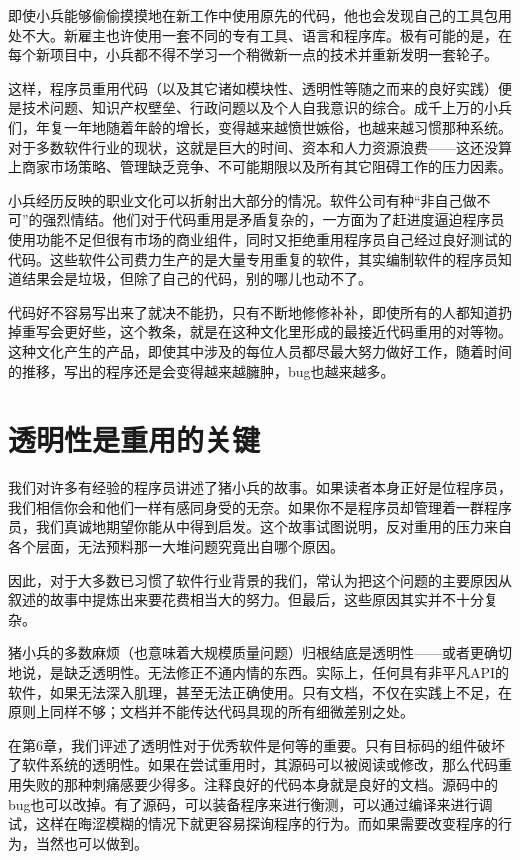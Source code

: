 \documentclass[12pt,oneside]{book}
\begin{document}
即使小兵能够偷偷摸摸地在新工作中使用原先的代码，他也会发现自己的工具包用处不大。新雇主也许使用一套不同的专有工具、语言和程序库。极有可能的是，在每个新项目中，小兵都不得不学习一个稍微新一点的技术并重新发明一套轮子。

这样，程序员重用代码（以及其它诸如模块性、透明性等随之而来的良好实践）便是技术问题、知识产权壁垒、行政问题以及个人自我意识的综合。成千上万的小兵们，年复一年地随着年龄的增长，变得越来越愤世嫉俗，也越来越习惯那种系统。对于多数软件行业的现状，这就是巨大的时间、资本和人力资源浪费——这还没算上商家市场策略、管理缺乏竞争、不可能期限以及所有其它阻碍工作的压力因素。

小兵经历反映的职业文化可以折射出大部分的情况。软件公司有种“非自己做不可”的强烈情结。他们对于代码重用是矛盾复杂的，一方面为了赶进度逼迫程序员使用功能不足但很有市场的商业组件，同时又拒绝重用程序员自己经过良好测试的代码。这些软件公司费力生产的是大量专用重复的软件，其实编制软件的程序员知道结果会是垃圾，但除了自己的代码，别的哪儿也动不了。

代码好不容易写出来了就决不能扔，只有不断地修修补补，即使所有的人都知道扔掉重写会更好些，这个教条，就是在这种文化里形成的最接近代码重用的对等物。这种文化产生的产品，即使其中涉及的每位人员都尽最大努力做好工作，随着时间的推移，写出的程序还是会变得越来越臃肿，bug也越来越多。


\section{透明性是重用的关键}
我们对许多有经验的程序员讲述了猪小兵的故事。如果读者本身正好是位程序员，我们相信你会和他们一样有感同身受的无奈。如果你不是程序员却管理着一群程序员，我们真诚地期望你能从中得到启发。这个故事试图说明，反对重用的压力来自各个层面，无法预料那一大堆问题究竟出自哪个原因。

因此，对于大多数已习惯了软件行业背景的我们，常认为把这个问题的主要原因从叙述的故事中提炼出来要花费相当大的努力。但最后，这些原因其实并不十分复杂。

猪小兵的多数麻烦（也意味着大规模质量问题）归根结底是透明性——或者更确切地说，是缺乏透明性。无法修正不通内情的东西。实际上，任何具有非平凡API的软件，如果无法深入肌理，甚至无法正确使用。只有文档，不仅在实践上不足，在原则上同样不够；文档并不能传达代码具现的所有细微差别之处。

在第6章，我们评述了透明性对于优秀软件是何等的重要。只有目标码的组件破坏了软件系统的透明性。如果在尝试重用时，其源码可以被阅读或修改，那么代码重用失败的那种刺痛感要少得多。注释良好的代码本身就是良好的文档。源码中的bug也可以改掉。有了源码，可以装备程序来进行衡测，可以通过编译来进行调试，这样在晦涩模糊的情况下就更容易探询程序的行为。而如果需要改变程序的行为，当然也可以做到。
\end{document}
